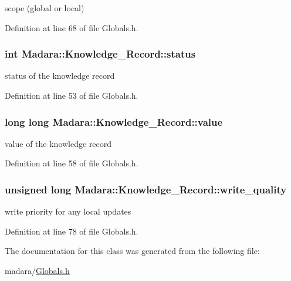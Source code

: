 scope (global or local) 



Definition at line 68 of file Globals.h.

\hypertarget{classMadara_1_1Knowledge__Record_a733d1b9ef2803c4767b1d5e13e0fd51d}{
\subsubsection[{status}]{\setlength{\rightskip}{0pt plus 5cm}int {\bf Madara::Knowledge\_\-Record::status}}}
\label{d9/dcb/classMadara_1_1Knowledge__Record_a733d1b9ef2803c4767b1d5e13e0fd51d}


status of the knowledge record 



Definition at line 53 of file Globals.h.

\hypertarget{classMadara_1_1Knowledge__Record_a073d8b21a172cea83d0e10355e9f4929}{
\subsubsection[{value}]{\setlength{\rightskip}{0pt plus 5cm}long long {\bf Madara::Knowledge\_\-Record::value}}}
\label{d9/dcb/classMadara_1_1Knowledge__Record_a073d8b21a172cea83d0e10355e9f4929}


value of the knowledge record 



Definition at line 58 of file Globals.h.

\hypertarget{classMadara_1_1Knowledge__Record_a25f274b4cb90a66c8d08eb6aebedd954}{
\subsubsection[{write\_\-quality}]{\setlength{\rightskip}{0pt plus 5cm}unsigned long {\bf Madara::Knowledge\_\-Record::write\_\-quality}}}
\label{d9/dcb/classMadara_1_1Knowledge__Record_a25f274b4cb90a66c8d08eb6aebedd954}


write priority for any local updates 



Definition at line 78 of file Globals.h.



The documentation for this class was generated from the following file:\begin{DoxyCompactItemize}
\item 
madara/\hyperlink{Globals_8h}{Globals.h}\end{DoxyCompactItemize}
